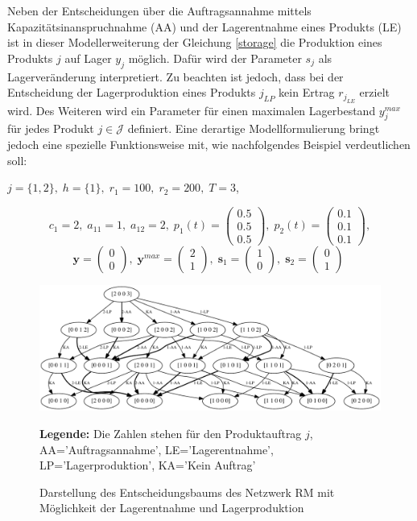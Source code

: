 Neben der Entscheidungen über die Auftragsannahme mittels Kapazitätsinanspruchnahme (AA) und der Lagerentnahme eines Produkts (LE) ist in dieser Modellerweiterung der Gleichung \eqref{storage} die Produktion eines Produkts $j$ auf Lager $y_{j}$ möglich. Dafür wird der Parameter $s_{j}$ als Lagerveränderung interpretiert. Zu beachten ist jedoch, dass bei der Entscheidung der Lagerproduktion eines Produkts $j_{LP}$ kein Ertrag $r_{j_{LE}}$ erzielt wird. Des Weiteren wird ein Parameter für einen maximalen Lagerbestand $y_{j}^{max}$ für jedes Produkt $j\in\mathcal{J}$ definiert. Eine derartige Modellformulierung bringt jedoch eine spezielle Funktionsweise mit, wie nachfolgendes Beispiel verdeutlichen soll:
\begin{center}
$j = \{1, 2\}, \; h = \{1\}, \; r_{1} = 100, \; r_{2} = 200, \; T=3$,
\end{center}
\[
    c_{1}=2, \;
    a_{11}=1, \;
     a_{12}=2, \;
     p_{1}(t)=\begin{pmatrix} 0.5\\ 0.5\\ 0.5  \end{pmatrix}, \;
     p_{2}(t)=\begin{pmatrix} 0.1\\ 0.1\\ 0.1  \end{pmatrix},
  \]
  \[
    \textbf{y}=\begin{pmatrix} 0 \\ 0 \end{pmatrix}, \;
    \textbf{y}^{max}=\begin{pmatrix} 2 \\ 1 \end{pmatrix}, \;
    \textbf{s}_1=\begin{pmatrix} 1 \\ 0 \end{pmatrix}, \;
     \textbf{s}_2=\begin{pmatrix} 0 \\ 1 \end{pmatrix} \;
  \]
\begin{figure}[h!]
  \begin{center}
    \includegraphics[width=130mm]{Bilder/Beispiel4.pdf}
    \caption{Darstellung des Entscheidungsbaums des Netzwerk RM mit Möglichkeit der Lagerentnahme und Lagerproduktion}  \label{B4}
    {\footnotesize \textbf{Legende:} Die Zahlen stehen für den Produktauftrag $j$, AA='Auftragsannahme', LE='Lagerentnahme', LP='Lagerproduktion', KA='Kein Auftrag'} 
  \end{center}
\end{figure}

